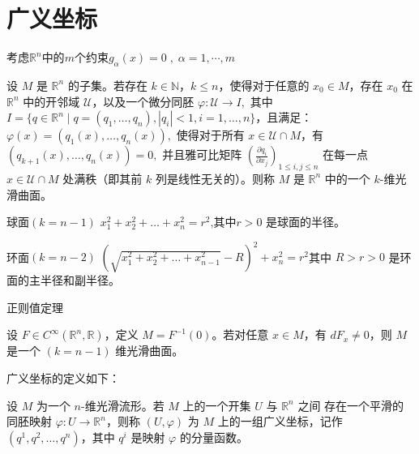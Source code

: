 \documentclass[12pt, a4paper, oneside, UTF8]{ctexbook}  %
\begin{document}
\section{广义坐标}
考虑\(\mathbb{R}^n\)中的\(m\)个约束\(g_\alpha(x)=0\; ,\; \alpha=1,\cdots,m\)
\begin{defn}[k维曲面]
    设 $ M $ 是 $\mathbb{R}^n$ 的子集。若存在 $ k \in \mathbb{N} $，$ k \leq n $，使得对于任意的 $ x_0 \in M $，存在 $ x_0 $ 在 $\mathbb{R}^n$ 中的开邻域 $\mathcal{U}$，以及一个微分同胚
    $
    \varphi: \mathcal{U} \to I,
    $
    其中 $ I = \{ q \in \mathbb{R}^n \mid q = (q_1, \dots, q_n), |q_i| < 1, i = 1, \dots, n \} $，且满足：
    $
    \varphi(x) = (q_1(x), \dots, q_n(x)),
    $
    使得对于所有 $ x \in \mathcal{U} \cap M $，有
    $
    (q_{k+1}(x), \dots, q_n(x)) = 0,
    $
    并且雅可比矩阵
    $
    \left( \frac{\partial q_i}{\partial x_j} \right)_{1 \leq i,j \leq n}
    $
    在每一点 $ x \in \mathcal{U} \cap M $ 处满秩（即其前 $ k $ 列是线性无关的）。则称 $ M $ 是 $\mathbb{R}^n$ 中的一个 $ k $-维光滑曲面。
    \end{defn}
\begin{example}
    球面\((k =n-1)\)
    \(x_1^2 + x_2^2 + \dots + x_n^2 = r^2\),其中\(r>0\) 是球面的半径。
\end{example}
\begin{example}
    环面\((k=n-2)\)
    \(\left( \sqrt{x_1^2 + x_2^2 + \dots + x_{n-1}^2} - R \right)^2 + x_n^2 = r^2
\)其中 \(R>r>0\) 是环面的主半径和副半径。
\end{example}
\begin{thm}
    正则值定理

    设 $ F \in C^\infty(\mathbb{R}^n, \mathbb{R}) $，定义 $ M = F^{-1}(0) $。若对任意 $ x \in M $，有 $ dF_x \neq 0 $，则 $ M $ 是一个 $ (k=n-1) $ 维光滑曲面。
\end{thm}
广义坐标的定义如下：

设 $ M $ 为一个 $ n $-维光滑流形。若 $ M $ 上的一个开集 $ U $ 与 $ \mathbb{R}^n $ 之间
存在一个平滑的同胚映射 $ \varphi: U \rightarrow \mathbb{R}^n $，则称 $ (U, \varphi) $ 
为 $ M $ 上的一组广义坐标，记作 $ (q^1, q^2, \dots, q^n) $，其中 $ q^i $ 是映射 $ \varphi $ 的分量函数。
\end{document}
